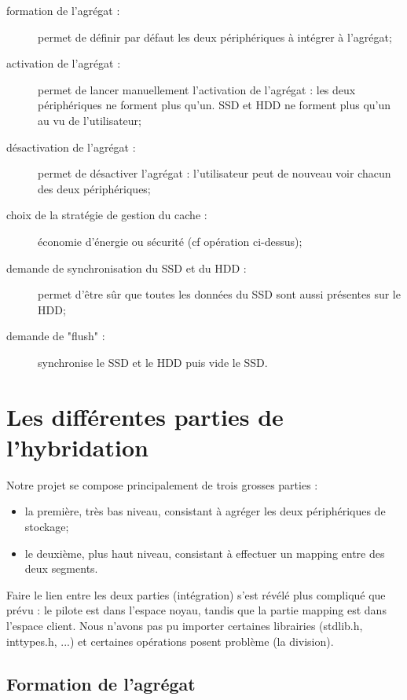 \documentclass[a4paper,10pt]{article}
\begin{document}
\begin{description}
 \item [formation de l'agrégat :] permet de définir par défaut les deux périphériques à intégrer à l'agrégat;
 \item [activation de l'agrégat :] permet de lancer manuellement l'activation de l'agrégat : les deux périphériques ne forment plus qu'un. SSD et HDD ne 
forment plus qu'un au vu de l'utilisateur;
 \item [désactivation de l'agrégat :] permet de désactiver l'agrégat : l'utilisateur peut de nouveau voir chacun des deux périphériques;
 \item [choix de la stratégie de gestion du cache :] économie d'énergie ou sécurité (cf opération ci-dessus);
 \item [demande de synchronisation du SSD et du HDD :] permet d'être sûr que toutes les données du SSD sont aussi présentes sur le HDD;
 \item [demande de "flush" :] synchronise le SSD et le HDD puis vide le SSD.
\end{description}

\section{Les différentes parties de l'hybridation}
Notre projet se compose principalement de trois grosses parties : 
\begin{itemize}
 \item la première, très bas niveau, consistant à agréger les deux périphériques de stockage;
 \item le deuxième, plus haut niveau, consistant à effectuer un mapping entre des deux segments.
\end{itemize}
\medskip
Faire le lien entre les deux parties (intégration) s'est révélé plus compliqué que prévu : le pilote est dans l'espace noyau, tandis que la partie mapping 
est dans l'espace client. Nous n'avons pas pu importer certaines librairies (stdlib.h, inttypes.h, ...) et certaines opérations posent problème (la division).

\subsection{Formation de l'agrégat}
\end{document}
